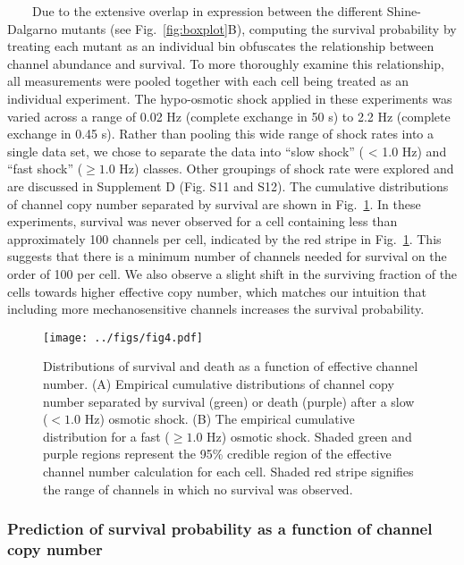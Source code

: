 ~~~~Due
to the
extensive
overlap
in
expression
between
the
different
Shine-Dalgarno
mutants
(see
Fig.~\ref{fig:boxplot}B),
computing
the
survival
probability
by
treating
each
mutant
as an
individual
bin
obfuscates
the
relationship
between
channel
abundance
and
survival.
To
more
thoroughly
examine
this
relationship,
all
measurements
were
pooled
together
with
each
cell
being
treated
as an
individual
experiment.
The
hypo-osmotic
shock
applied
in
these
experiments
was
varied
across
a
range
of
0.02
Hz
(complete
exchange
in 50
s) to
2.2 Hz
(complete
exchange
in
0.45
s).
Rather
than
pooling
this
wide
range
of
shock
rates
into a
single
data
set,
we
chose
to
separate
the
data
into
``slow
shock''
(
\textless{}
1.0
Hz)
and
``fast
shock''
(\(\geq 1.0\)
Hz)
classes.
Other
groupings
of
shock
rate
were
explored
and
are
discussed
in
Supplement
D
(Fig.
S11
and
S12).
The
cumulative
distributions
of
channel
copy
number
separated
by
survival
are
shown
in
Fig.~\ref{fig:survival_dists}.
In
these
experiments,
survival
was
never
observed
for a
cell
containing
less
than
approximately
100
channels
per
cell,
indicated
by the
red
stripe
in
Fig.~\ref{fig:survival_dists}.
This
suggests
that
there
is a
minimum
number
of
channels
needed
for
survival
on the
order
of 100
per
cell.
We
also
observe
a
slight
shift
in the
surviving
fraction
of the
cells
towards
higher
effective
copy
number,
which
matches
our
intuition
that
including
more
mechanosensitive
channels
increases
the
survival
probability.

\begin{figure}
\centering
\texttt{[image: ../figs/fig4.pdf]}
\caption{Distributions
of
survival
and
death
as a
function
of
effective
channel
number.
(A)
Empirical
cumulative
distributions
of
channel
copy
number
separated
by
survival
(green)
or
death
(purple)
after
a slow
(\(< 1.0\)
Hz)
osmotic
shock.
(B)
The
empirical
cumulative
distribution
for a
fast
(\(\geq 1.0\)
Hz)
osmotic
shock.
Shaded
green
and
purple
regions
represent
the
95\%
credible
region
of the
effective
channel
number
calculation
for
each
cell.
Shaded
red
stripe
signifies
the
range
of
channels
in
which
no
survival
was
observed.}\label{fig:survival_dists}
\end{figure}

\subsubsection{Prediction
of
survival
probability
as a
function
of
channel
copy
number}\label{prediction-of-survival-probability-as-a-function-of-channel-copy-number}


